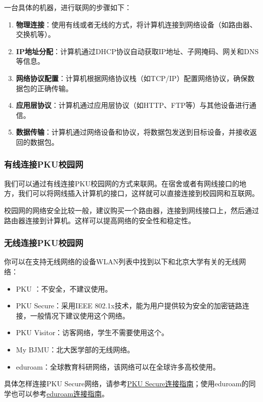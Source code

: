 \documentclass[../main.tex]{subfiles}
\begin{document}
一台具体的机器，进行联网的步骤如下：
\begin{enumerate}
  \item \textbf{物理连接}：使用有线或者无线的方式，将计算机连接到网络设备（如路由器、交换机等）。
  \item \textbf{IP地址分配}：计算机通过DHCP协议自动获取IP地址、子网掩码、网关和DNS等信息。
  \item \textbf{网络协议配置}：计算机根据网络协议栈（如TCP/IP）配置网络协议，确保数据包的正确传输。
  \item \textbf{应用层协议}：计算机通过应用层协议（如HTTP、FTP等）与其他设备进行通信。
  \item \textbf{数据传输}：计算机通过网络设备和协议，将数据包发送到目标设备，并接收返回的数据包。
\end{enumerate}

\subsubsection{有线连接PKU校园网}

我们可以通过有线连接PKU校园网的方式来联网。在宿舍或者有网线接口的地方，我们可以将网线插入计算机的接口，这样就可以直接连接到校园网和互联网。

校园网的网络安全比较一般，建议购买一个路由器，连接到网线接口上，然后通过路由器连接到计算机。这样可以提高网络的安全性和稳定性。

\subsubsection{无线连接PKU校园网}

你可以在支持无线网络的设备WLAN列表中找到以下和北京大学有关的无线网络：
\begin{itemize}
  \item PKU ：不安全，不建议使用。
  \item PKU Secure：采用IEEE 802.1x技术，能为用户提供较为安全的加密链路连接，一般情况下建议使用这个网络。
  \item PKU Visitor：访客网络，学生不需要使用这个。
  \item My BJMU：北大医学部的无线网络。
  \item eduroam：全球教育科研网络，该网络可以在全球许多高校使用。
\end{itemize}
具体怎样连接PKU Secure网络，请参考\href{https://its.pku.edu.cn/setting_6.jsp}{PKU Secure连接指南}；使用eduroam的同学也可以参考\href{https://its.pku.edu.cn/service_1_eduroam.jsp}{eduroam连接指南}。
\end{document}
